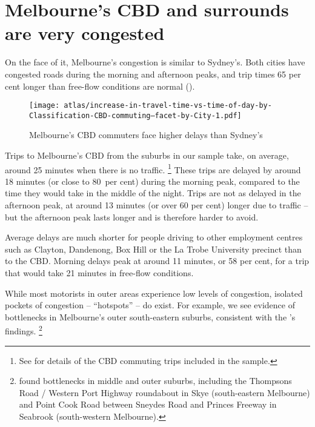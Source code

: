 \documentclass{grattan}
\begin{document}
\section{Melbourne's CBD and surrounds are very congested}

On the face of it, Melbourne's congestion is similar to Sydney's. Both cities have congested roads during the morning and afternoon peaks, and trip times 65 per cent longer than free-flow conditions are normal ().

\begin{figure}
\caption{Melbourne's CBD commuters face higher delays than Sydney's}\label{fig:Melb-CBD-v-Non-CBD-commutes}
\texttt{[image: atlas/increase-in-travel-time-vs-time-of-day-by-Classification-CBD-commuting--facet-by-City-1.pdf]}
\end{figure}

Trips to Melbourne's CBD from the suburbs in our sample take, on average, around 25 minutes when there is no traffic.%
    \footnote{See  for details of the CBD commuting trips included in the sample.}
These trips are delayed by around 18 minutes (or close to 80~per cent) during the morning peak, compared to the time they would take in the middle of the night. Trips are not as delayed in the afternoon peak, at around 13 minutes (or over 60 per cent) longer due to traffic -- but the afternoon peak lasts longer and is therefore harder to avoid.

Average delays are much shorter for people driving to other employment centres such as Clayton, Dandenong, Box Hill or the La Trobe University precinct than to the CBD\@.
Morning delays peak at around 11 minutes, or 58 per cent, for a trip that would take 21 minutes in free-flow conditions. 

While most motorists in outer areas experience low levels of congestion, isolated pockets of congestion -- ``hotspots'' -- do exist. For example, we see evidence of bottlenecks in Melbourne's outer south-eastern suburbs, consistent with the \citeauthor{Redspotsurvey}'s  findings.%
    \footnote{\citeauthor{Redspotsurvey}  found bottlenecks in middle and outer suburbs, including the Thompsons Road / Western Port Highway roundabout in Skye (south-eastern Melbourne) and Point Cook Road between Sneydes Road and Princes Freeway in Seabrook (south-western Melbourne).}
\end{document}
